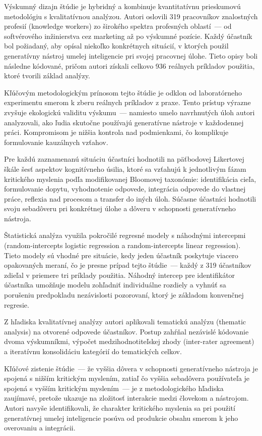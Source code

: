Výskumný dizajn štúdie je hybridný a kombinuje kvantitatívnu prieskumovú metodológiu s kvalitatívnou analýzou. Autori oslovili 319 pracovníkov znalostných profesií (knowledge workers) zo širokého spektra profesných oblastí~--- od softvérového inžinierstva cez marketing až po výskumné pozície. Každý účastník bol požiadaný, aby opísal niekoľko konkrétnych situácií, v ktorých použil generatívny nástroj umelej inteligencie pri svojej pracovnej úlohe. Tieto opisy boli následne kódované, pričom autori získali celkovo 936 reálnych príkladov použitia, ktoré tvorili základ analýzy.

Kľúčovým metodologickým prínosom tejto štúdie je odklon od laboratórneho experimentu smerom k zberu reálnych príkladov z praxe. Tento prístup výrazne zvyšuje ekologickú validitu výskumu~--- namiesto umelo navrhnutých úloh autori analyzovali, ako ľudia skutočne používajú generatívne nástroje v každodennej práci. Kompromisom je nižšia kontrola nad podmienkami, čo komplikuje formulovanie kauzálnych vzťahov.

Pre každú zaznamenanú situáciu účastníci hodnotili na päťbodovej Likertovej škále šesť aspektov kognitívneho úsilia, ktoré sa vzťahujú k jednotlivým fázam kritického myslenia podľa modifikovanej Bloomovej taxonómie: identifikácia cieľa, formulovanie dopytu, vyhodnotenie odpovede, integrácia odpovede do vlastnej práce, reflexia nad procesom a transfer do iných úloh. Súčasne účastníci hodnotili svoju sebadôveru pri konkrétnej úlohe a dôveru v schopnosti generatívneho nástroja.

Štatistická analýza využila pokročilé regresné modely s náhodnými intercepmi (random-intercepts logistic regression a random-intercepts linear regression). Tieto modely sú vhodné pre situácie, kedy jeden účastník poskytuje viacero opakovaných meraní, čo je presne prípad tejto štúdie~--- každý z 319 účastníkov zdieľal v priemere tri príklady použitia. Náhodný intercep pre identifikátor účastníka umožňuje modelu zohľadniť individuálne rozdiely a vyhnúť sa porušeniu predpokladu nezávislosti pozorovaní, ktorý je základom konvenčnej regresie.

Z hľadiska kvalitatívnej analýzy autori aplikovali tematickú analýzu (thematic analysis) na otvorené odpovede účastníkov. Postup zahŕňal nezávislé kódovanie dvoma výskumníkmi, výpočet medzihodnotiteľskej zhody (inter-rater agreement) a iteratívnu konsolidáciu kategórií do tematických celkov.

Kľúčové zistenie štúdie~--- že vyššia dôvera v schopnosti generatívneho nástroja je spojená s nižším kritickým myslením, zatiaľ čo vyššia sebadôvera používateľa je spojená s vyšším kritickým myslením~--- je z metodologického hľadiska zaujímavé, pretože ukazuje na zložitosť interakcie medzi človekom a nástrojom. Autori navyše identifikovali, že charakter kritického myslenia sa pri použití generatívnej umelej inteligencie posúva od produkcie obsahu smerom k jeho overovaniu a integrácii.

